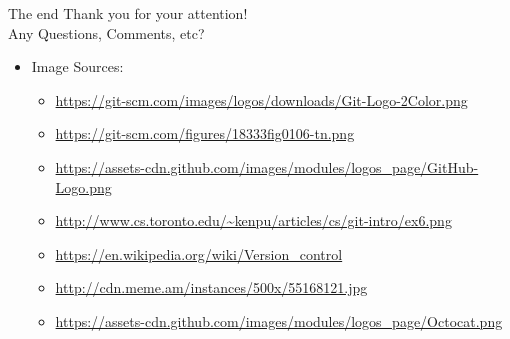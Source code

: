 \documentclass{beamer}
\begin{document}
    \begin{frame}{The end}
      {\huge
        Thank you for your attention!\\
        Any Questions, Comments, etc?
      }
      
      \begin{itemize}
        \item Image Sources: 
        \begin{itemize}
          \item \url{https://git-scm.com/images/logos/downloads/Git-Logo-2Color.png}
          \item \url{https://git-scm.com/figures/18333fig0106-tn.png}
          \item \url{https://assets-cdn.github.com/images/modules/logos_page/GitHub-Logo.png}
          \item \url{http://www.cs.toronto.edu/~kenpu/articles/cs/git-intro/ex6.png}
          \item \url{https://en.wikipedia.org/wiki/Version_control}
          \item \url{http://cdn.meme.am/instances/500x/55168121.jpg}
          \item \url{https://assets-cdn.github.com/images/modules/logos_page/Octocat.png}
        \end{itemize}  
      \end{itemize}
    \end{frame}
\end{document}
